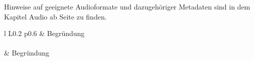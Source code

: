 Hinweise auf geeignete Audioformate und dazugehöriger Metadaten sind in dem Kapitel Audio ab Seite \pageref{audio} zu finden.

\pagebreak
\begin{center}
	\begin{longtable}{l L{0.2\textwidth} p{0.6\textwidth}}
			\toprule 
		 & Begründung \\
		\midrule \endfirsthead
		\\
		\toprule
		 & Begründung \\ \midrule \endhead
		\bottomrule {} \\
		\endfoot
		\bottomrule 
		\endlastfoot
		

\end{longtable}
\end{center}
